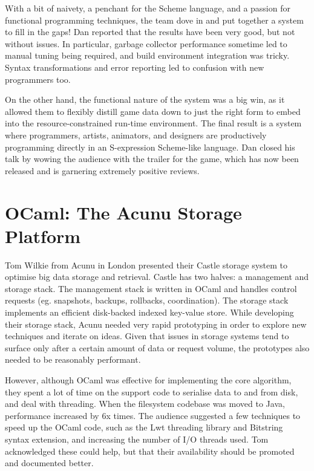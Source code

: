 \documentclass{jfp1}
\begin{document}
With a bit of naivety, a penchant for the Scheme language, and a passion
for functional programming techniques, the team dove in and put together
a system to fill in the gaps!  Dan reported that the results have been
very good, but not without issues.  In particular, garbage collector
performance sometime led to manual tuning being required, and build
environment integration was tricky. Syntax transformations and error
reporting led to confusion with new programmers too.

On the other hand, the functional nature of the system was a big win, as
it allowed them to flexibly distill game data down to just the right
form to embed into the resource-constrained run-time environment.  The
final result is a system where programmers, artists, animators, and
designers are productively programming directly in an S-expression
Scheme-like language.  Dan closed his talk by wowing the audience with the
trailer for the game, which has now been released and is garnering extremely positive reviews.

\section{OCaml: The Acunu Storage Platform}

Tom Wilkie from Acunu in London presented their Castle storage system to
optimise big data storage and retrieval. Castle has two halves: a management and storage stack.
The management stack  is written in OCaml and handles control requests
(eg. snapshots, backups, rollbacks, coordination). The storage stack
implements an efficient disk-backed indexed key-value store. While
developing their storage stack, Acunu needed very rapid prototyping in
order to explore new techniques and iterate on ideas. Given that issues
in storage systems tend to surface only after a certain amount of data
or request volume, the prototypes also needed to be reasonably
performant.

However, although OCaml was effective for implementing the core
algorithm, they spent a lot of time on the support code to serialise
data to and from disk, and deal with threading. When the filesystem
codebase was moved to Java, performance increased by 6x times. The
audience suggested a few techniques to speed up the OCaml code, such as
the Lwt threading library and Bitstring syntax extension, and increasing
the number of I/O threads used. Tom acknowledged these could help, but
that their availability should be promoted and documented better.
\end{document}
